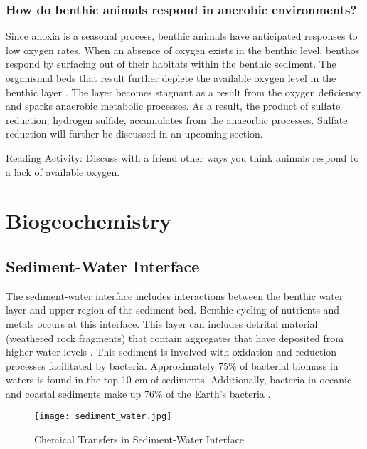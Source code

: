 \subsubsection{How do benthic animals respond in anerobic environments?}
Since anoxia is a seasonal process, benthic animals have anticipated responses to low oxygen rates. When an absence of oxygen exists in the benthic level, benthos respond by surfacing out of their habitats within the benthic sediment. The organismal beds that result further deplete the available oxygen level in the benthic layer \citep{jorgensen1980seasonal}. The layer becomes stagnant as a result from the oxygen deficiency and sparks anaerobic metabolic processes. As a result, the product of sulfate reduction, hydrogen sulfide, accumulates from the anaeorbic processes. Sulfate reduction will further be discussed in an upcoming section.

Reading Activity: Discuss with a friend other ways you think animals respond to a lack of available oxygen.

\section{Biogeochemistry}
\subsection{Sediment-Water Interface}

The sediment-water interface includes interactions between the benthic water layer and upper region of the sediment bed. Benthic cycling of nutrients and metals occurs at this interface. This layer can includes detrital material (weathered rock fragments) that contain aggregates that have deposited from higher water levels \citep{turley2000bacteria}. This sediment is involved with oxidation and reduction processes facilitated by bacteria.
Approximately 75\% of bacterial biomass in waters is found in the top 10 cm of sediments. Additionally, bacteria in oceanic and coastal sediments make up 76\% of the Earth's bacteria \citep{turley2000bacteria}. 

\begin{figure}[!h]
        \centering
        \texttt{[image: sediment\_water.jpg]}
        \caption{Chemical Transfers in Sediment-Water Interface}
        \label{fig:Sediment-Water Processes}
\end{figure}

